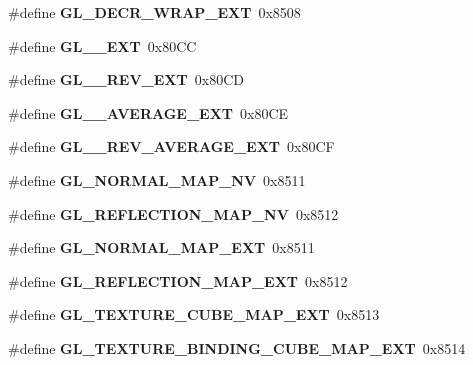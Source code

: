 \begin{DoxyCompactItemize}
\item 
\#define {\bfseries G\+L\+\_\+\+D\+E\+C\+R\+\_\+\+W\+R\+A\+P\+\_\+\+E\+X\+T}~0x8508\label{_s_d_l__opengl_8h_a8ff9ae02e45839045dafc77056d0ee93}

\item 
\#define {\bfseries G\+L\+\_\+\_\+\+E\+X\+T}~0x80\+C\+C\label{_s_d_l__opengl_8h_aad503453be8635ce634e74657b7a2592}

\item 
\#define {\bfseries G\+L\+\_\+\_\+\+R\+E\+V\+\_\+\+E\+X\+T}~0x80\+C\+D\label{_s_d_l__opengl_8h_a77c00d20089a5af8d25c86355635d71e}

\item 
\#define {\bfseries G\+L\+\_\+\_\+\+A\+V\+E\+R\+A\+G\+E\+\_\+\+E\+X\+T}~0x80\+C\+E\label{_s_d_l__opengl_8h_a95d2ac32e0528175190f173671bd66ce}

\item 
\#define {\bfseries G\+L\+\_\+\_\+\+R\+E\+V\+\_\+\+A\+V\+E\+R\+A\+G\+E\+\_\+\+E\+X\+T}~0x80\+C\+F\label{_s_d_l__opengl_8h_afaa3d818e1b68101b8bda1d334b67198}

\item 
\#define {\bfseries G\+L\+\_\+\+N\+O\+R\+M\+A\+L\+\_\+\+M\+A\+P\+\_\+\+N\+V}~0x8511\label{_s_d_l__opengl_8h_ac0b31313ba0bc6444de2b6b899b7fc6c}

\item 
\#define {\bfseries G\+L\+\_\+\+R\+E\+F\+L\+E\+C\+T\+I\+O\+N\+\_\+\+M\+A\+P\+\_\+\+N\+V}~0x8512\label{_s_d_l__opengl_8h_ad38be0d100e800582db0192dd5cceade}

\item 
\#define {\bfseries G\+L\+\_\+\+N\+O\+R\+M\+A\+L\+\_\+\+M\+A\+P\+\_\+\+E\+X\+T}~0x8511\label{_s_d_l__opengl_8h_af332e7a4d63af4227521f8cc86bcf9df}

\item 
\#define {\bfseries G\+L\+\_\+\+R\+E\+F\+L\+E\+C\+T\+I\+O\+N\+\_\+\+M\+A\+P\+\_\+\+E\+X\+T}~0x8512\label{_s_d_l__opengl_8h_a11eb51c5c9b84bd0ee1942124b5322c8}

\item 
\#define {\bfseries G\+L\+\_\+\+T\+E\+X\+T\+U\+R\+E\+\_\+\+C\+U\+B\+E\+\_\+\+M\+A\+P\+\_\+\+E\+X\+T}~0x8513\label{_s_d_l__opengl_8h_a68d6f70fd3d5ff2aa08be209eabc5cd8}

\item 
\#define {\bfseries G\+L\+\_\+\+T\+E\+X\+T\+U\+R\+E\+\_\+\+B\+I\+N\+D\+I\+N\+G\+\_\+\+C\+U\+B\+E\+\_\+\+M\+A\+P\+\_\+\+E\+X\+T}~0x8514\label{_s_d_l__opengl_8h_a261b1cbc01a8cfb6392899d4102a9285}


\end{DoxyCompactItemize}
